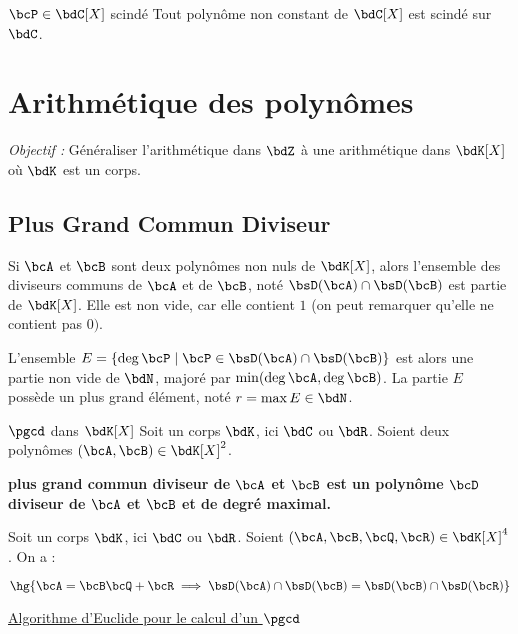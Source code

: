 \documentclass[a4paper,french,bookmarks]{article}
\begin{document}

\begin{corollary}{$\bcP \in \bdC[X]$ scindé}{}
    Tout polynôme non constant de $\bdC[X]$ est scindé sur $\bdC$.
\end{corollary}

\newpage

\section{Arithmétique des polynômes}

\textit{Objectif :} Généraliser l'arithmétique dans $\bdZ$ à une arithmétique dans $\bdK[X]$ où $\bdK$ est un corps.

\subsection{Plus Grand Commun Diviseur}

Si $\bcA$ et $\bcB$ sont deux polynômes non nuls de $\bdK[X]$, alors l'ensemble des diviseurs communs de $\bcA$ et de $\bcB$, noté $\bsD(\bcA) \cap \bsD(\bcB)$ est partie de $\bdK[X]$. Elle est non vide, car elle contient $1$ (on peut remarquer qu'elle ne contient pas $0)$.

L'ensemble $E = \{ \deg \bcP \mid \bcP \in \bsD(\bcA) \cap \bsD(\bcB) \}$ est alors une partie non vide de $\bdN$, majoré par $\min(\deg \bcA, \deg \bcB)$. La partie $E$ possède un plus grand élément, noté $r = \max E \in \bdN$.

\begin{definition}{$\pgcd$ dans $\bdK[X]$}{}
    Soit un corps $\bdK$, ici $\bdC$ ou $\bdR$. Soient deux polynômes $(\bcA, \bcB) \in \bdK[X]^2$. 
    
     \bf{plus grand commun diviseur de $\bcA$ et $\bcB$} est un polynôme $\bcD$ diviseur de $\bcA$ et $\bcB$ et de degré maximal.
\end{definition}

\begin{lemma}{}{}
    Soit un corps $\bdK$, ici $\bdC$ ou $\bdR$. Soient $(\bcA, \bcB, \bcQ, \bcR) \in \bdK[X]^4$. On a :
    
    \[\hg{\bcA = \bcB\bcQ + \bcR \implies \bsD(\bcA) \cap \bsD(\bcB) = \bsD(\bcB) \cap \bsD(\bcR)}\]
\end{lemma}

\begin{center}
    \underline{Algorithme d'Euclide pour le calcul d'un $\pgcd$}
\end{center}
\end{document}
